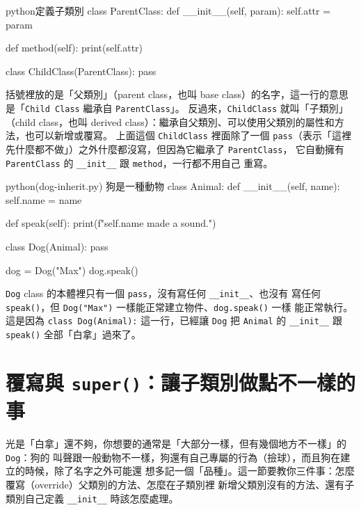 \begin{code}{python}{定義子類別}
class ParentClass:
    def __init__(self, param):
        self.attr = param

    def method(self):
        print(self.attr)


class ChildClass(ParentClass):
    pass
\end{code}

括號裡放的是「父類別」（parent class，也叫 base class）的名字，這一行的意思是「\texttt{Child
Class} 繼承自 \texttt{ParentClass}」。
反過來，\texttt{ChildClass} 就叫「子類別」（child
class，也叫 derived class）：繼承自父類別、可以使用父類別的屬性和方法，也可以新增或覆寫。
上面這個 \texttt{ChildClass} 裡面除了一個
\texttt{pass}（表示「這裡先什麼都不做」）之外什麼都沒寫，但因為它繼承了 \texttt{ParentClass}，
它自動擁有 \texttt{ParentClass} 的 \texttt{\_\_init\_\_} 跟 \texttt{method}，一行都不用自己
重寫。

\begin{example}{python}{(dog-inherit.py) 狗是一種動物}
class Animal:
    def __init__(self, name):
        self.name = name

    def speak(self):
        print(f"{self.name} made a sound.")


class Dog(Animal):
    pass


dog = Dog("Max")
dog.speak()
\end{example}


\texttt{Dog} class 的本體裡只有一個 \texttt{pass}，沒有寫任何 \texttt{\_\_init\_\_}、也沒有
寫任何 \texttt{speak()}，但 \texttt{Dog("Max")} 一樣能正常建立物件、\texttt{dog.speak()} 一樣
能正常執行。這是因為 \texttt{class Dog(Animal):} 這一行，已經讓 \texttt{Dog} 把 \texttt{Animal}
的 \texttt{\_\_init\_\_} 跟 \texttt{speak()} 全部「白拿」過來了。


\section{覆寫與 \texttt{super()}：讓子類別做點不一樣的事}
\label{sec:inheritance-basics}

光是「白拿」還不夠，你想要的通常是「大部分一樣，但有幾個地方不一樣」的 \texttt{Dog}：狗的
叫聲跟一般動物不一樣，狗還有自己專屬的行為（撿球），而且狗在建立的時候，除了名字之外可能還
想多記一個「品種」。這一節要教你三件事：怎麼覆寫（override）父類別的方法、怎麼在子類別裡
新增父類別沒有的方法、還有子類別自己定義 \texttt{\_\_init\_\_} 時該怎麼處理。

